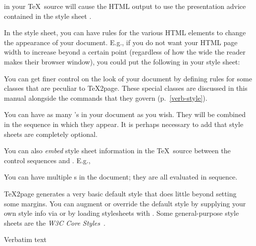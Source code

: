 
\n in your \TeX\ source will cause the HTML output to
use the presentation advice contained in the
style sheet .

In the style sheet, you can have rules for the various
HTML elements to change the appearance of your
document.  E.g., if you do not want your HTML page
width to increase beyond a certain point (regardless of
how the wide the reader makes their browser window),
you could put the following in your style sheet:


You can get finer control on the look of your document
by defining rules for some classes that are peculiar to
\TeX2page.  These special classes
are discussed in this manual alongside the commands
that they govern (p.~\ref{verb-style}).

You can have as many 's in your
document as you wish.  They will be combined in
the sequence in which they appear.  It is perhaps
necessary to add that style sheets are completely
optional.


You can also {\em embed} style sheet information
in the \TeX\ source between the control sequences
\p{\cssblock} and \p{\endcssblock}.  E.g.,


\n You can
have multiple \p{\cssblock}s in the document; they
are all evaluated in sequence.

\TeX2page generates a very basic default style
that
does little beyond setting some margins.  You
can augment or override the default style by supplying your
own style info via \p{\cssblock} or by loading
stylesheets with .   Some general-purpose
style sheets are the {\em W3C Core
Styles}~\cite{w3ccorestyles}.

 Verbatim text

